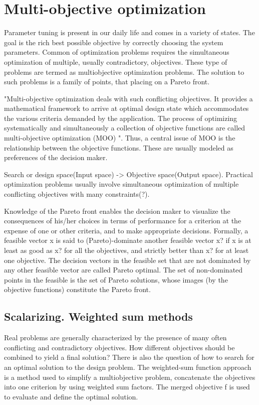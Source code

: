     
    \section{Multi-objective optimization}

        Parameter tuning is present in our daily life and comes in a variety of states. The goal is the rich best possible objective by correctly choosing the system parameters. 
        Common of optimization problems requires the simultaneous optimization of multiple, usually contradictory, objectives. These type of problems are termed as multiobjective optimization problems. The solution to such problems is a family of points, that placing on a Pareto front. 


        "Multi-objective optimization deals with such conflicting objectives. It provides a
        mathematical framework to arrive at optimal design state which accommodates the various criteria demanded by
        the application. The process of optimizing systematically and simultaneously a collection of objective functions
        are called multi-objective optimization (MOO) \cite{odugod2013}".
        Thus, a central issue of MOO is the relationship between the objective functions. These are usually modeled as preferences of the decision maker.

        Search or design space(Input space) -> Objective space(Output space).
        Practical optimization problems usually involve simultaneous optimization of multiple conflicting objectives with many constraints(?).

        Knowledge of the Pareto front enables the decision maker to visualize the consequences of his/her choices in terms of performance 
        for a criterion at the expense of one or other criteria, and to make appropriate decisions. Formally, a feasible vector x is said to (Pareto)-dominate another feasible vector x? if
        x is at least as good as x? for all the objectives, and strictly better than x? for at least one objective. The decision vectors in the feasible set 
        that are not dominated by any other feasible vector are called Pareto optimal. The set of non-dominated points in the 
        feasible is the set of Pareto solutions, whose images (by the objective functions) constitute the Pareto front.\cite{Audet2018PerformanceII}


        \subsection{Scalarizing. Weighted sum methods}
            Real problems are generally characterized by the presence of many often conflicting and contradictory objectives. How different objectives should be combined to yield a final solution? There is also the question of how to search for an optimal solution to the design problem. 
            The weighted-sum function approach is a method used to simplify a multiobjective problem, concatenate the objectives into one criterion by using weighted sum factors. The merged objective f is used to evaluate and define the optimal solution.

